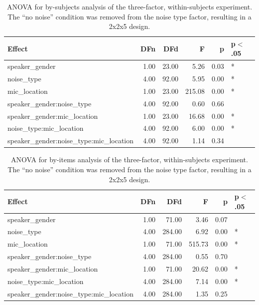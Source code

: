 \documentclass[dissertation,copyright]{uathesis}
\begin{document}
\begin{table}[ht]
\centering
\begin{tabular}{lrrrrl}
  \hline
Effect & DFn & DFd & F & p & p$<$.05 \\ 
  \hline
speaker\_gender & 1.00 & 23.00 & 5.26 & 0.03 & * \\ 
  noise\_type & 4.00 & 92.00 & 5.95 & 0.00 & * \\ 
  mic\_location & 1.00 & 23.00 & 215.08 & 0.00 & * \\ 
  speaker\_gender:noise\_type & 4.00 & 92.00 & 0.60 & 0.66 &  \\ 
  speaker\_gender:mic\_location & 1.00 & 23.00 & 16.68 & 0.00 & * \\ 
  noise\_type:mic\_location & 4.00 & 92.00 & 6.00 & 0.00 & * \\ 
  speaker\_gender:noise\_type:mic\_location & 4.00 & 92.00 & 1.14 & 0.34 &  \\ 
   \hline
\end{tabular}
\caption{ANOVA for by-subjects analysis of the three-factor, within-subjects experiment. The ``no noise'' condition was removed from the noise type factor, resulting in a 2x2x5 design.} 
\label{tab:anova2_by_subj}
\end{table}
\begin{table}[ht]
\centering
\begin{tabular}{lrrrrl}
  \hline
Effect & DFn & DFd & F & p & p$<$.05 \\ 
  \hline
speaker\_gender & 1.00 & 71.00 & 3.46 & 0.07 &  \\ 
  noise\_type & 4.00 & 284.00 & 6.92 & 0.00 & * \\ 
  mic\_location & 1.00 & 71.00 & 515.73 & 0.00 & * \\ 
  speaker\_gender:noise\_type & 4.00 & 284.00 & 0.55 & 0.70 &  \\ 
  speaker\_gender:mic\_location & 1.00 & 71.00 & 20.62 & 0.00 & * \\ 
  noise\_type:mic\_location & 4.00 & 284.00 & 7.14 & 0.00 & * \\ 
  speaker\_gender:noise\_type:mic\_location & 4.00 & 284.00 & 1.35 & 0.25 &  \\ 
   \hline
\end{tabular}
\caption{ANOVA for by-items analysis of the three-factor, within-subjects experiment. The ``no noise'' condition was removed from the noise type factor, resulting in a 2x2x5 design.} 
\label{tab:anova2_by_item}
\end{table}
\end{document}
